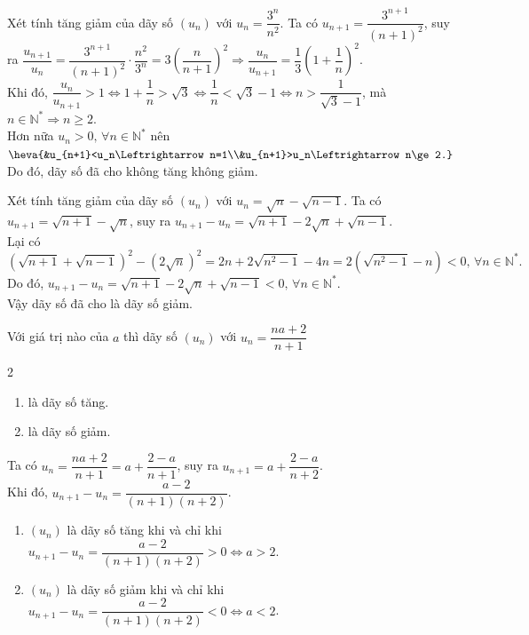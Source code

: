 \begin{bt}%
	Xét tính tăng giảm của dãy số $(u_n)$ với $u_n=\dfrac{3^n}{n^2}$.
	\loigiai 
	{
		Ta có $u_{n+1}=\dfrac{3^{n+1}}{(n+1)^2}$, suy ra $\dfrac{u_{n+1}}{u_n}=\dfrac{3^{n+1}}{(n+1)^2}\cdot \dfrac{n^2}{3^n}=3\left(\dfrac{n}{n+1}\right)^2\Rightarrow \dfrac{u_n}{u_{n+1}}=\dfrac{1}{3}\left(1+\dfrac{1}{n}\right)^2$.\\
		Khi đó, $\dfrac{u_n}{u_{n+1}}>1\Leftrightarrow 1+\dfrac{1}{n}>\sqrt{3}\Leftrightarrow \dfrac{1}{n}<\sqrt{3}-1\Leftrightarrow n>\dfrac{1}{\sqrt{3}-1}$, mà $n\in\mathbb{N}^*\Rightarrow n\ge 2$.\\
		Hơn nữa $u_n>0,\, \forall n\in\mathbb{N}^*$ nên $\heva{&u_{n+1}<u_n\Leftrightarrow n=1\\&u_{n+1}>u_n\Leftrightarrow n\ge 2.}$\\
		Do đó, dãy số đã cho không tăng không giảm.
	}
\end{bt}

\begin{bt}%
	Xét tính tăng giảm của dãy số $(u_n)$ với $u_n=\sqrt{n}-\sqrt{n-1}$.
	\loigiai 
	{
		Ta có $u_{n+1}=\sqrt{n+1}-\sqrt{n}$, suy ra $u_{n+1}-u_n=\sqrt{n+1}-2\sqrt{n}+\sqrt{n-1}$.\\
		Lại có $$\left(\sqrt{n+1}+\sqrt{n-1}\right)^2-\left(2\sqrt{n}\right)^2=2n+2\sqrt{n^2-1}-4n=2\left(\sqrt{n^2-1}-n\right)<0,\,\forall n\in\mathbb{N}^*.$$
		Do đó, $u_{n+1}-u_n=\sqrt{n+1}-2\sqrt{n}+\sqrt{n-1}<0,\,\forall n\in\mathbb{N}^*$.\\
		Vậy dãy số đã cho là dãy số giảm.
	}
\end{bt}

\begin{bt}%
	Với giá trị nào của $a$ thì dãy số $(u_n)$ với $u_n=\dfrac{na+2}{n+1}$
	\begin{multicols}{2}
		\begin{enumerate}
			\item là dãy số tăng.
			\item là dãy số giảm.
		\end{enumerate}
	\end{multicols}
	\loigiai 
	{
		Ta có $u_n=\dfrac{na+2}{n+1}=a+\dfrac{2-a}{n+1}$, suy ra $u_{n+1}=a+\dfrac{2-a}{n+2}$.\\
		Khi đó, $u_{n+1}-u_n=\dfrac{a-2}{(n+1)(n+2)}$.
	\begin{enumerate}
		\item $(u_n)$ là dãy số tăng khi và chỉ khi $u_{n+1}-u_n=\dfrac{a-2}{(n+1)(n+2)}>0\Leftrightarrow a>2$.
		\item $(u_n)$ là dãy số giảm khi và chỉ khi $u_{n+1}-u_n=\dfrac{a-2}{(n+1)(n+2)}<0\Leftrightarrow a<2$.
	\end{enumerate}
	}
\end{bt}

